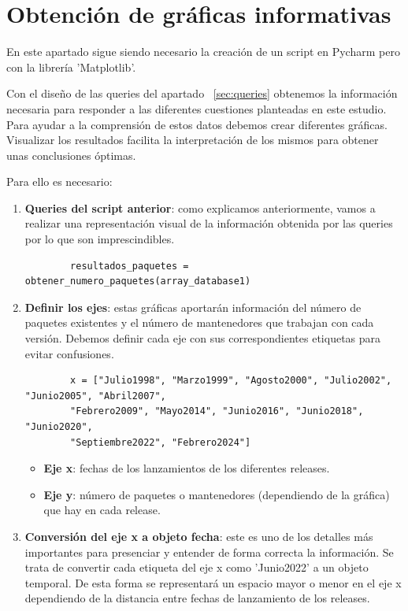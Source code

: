 \documentclass[a4paper, 12pt]{book}
\begin{document}
\section{Obtención de gráficas informativas}
\label{sec:graficas}

En este apartado sigue siendo necesario la creación de un script en Pycharm pero con la librería 'Matplotlib'.

Con el diseño de las queries del apartado ~\ref{sec:queries} obtenemos la información necesaria para responder a las diferentes cuestiones planteadas en este estudio.
Para ayudar a la comprensión de estos datos debemos crear diferentes gráficas.
Visualizar los resultados facilita la interpretación de los mismos para obtener unas conclusiones óptimas.

Para ello es necesario:
\begin{enumerate}
	\item \textbf{Queries del script anterior}: como explicamos anteriormente, vamos a realizar una representación visual de la información obtenida por las queries por lo que son imprescindibles.
	
	\begin{verbatim}
		resultados_paquetes = obtener_numero_paquetes(array_database1)
	\end{verbatim} 
	
	\item \textbf{Definir los ejes}: estas gráficas aportarán información del número de paquetes existentes y el número de mantenedores que trabajan con cada versión. Debemos definir cada eje con sus correspondientes etiquetas para evitar confusiones.
	
	\begin{verbatim}
		x = ["Julio1998", "Marzo1999", "Agosto2000", "Julio2002", "Junio2005", "Abril2007",
		"Febrero2009", "Mayo2014", "Junio2016", "Junio2018", "Junio2020",
		"Septiembre2022", "Febrero2024"]
	\end{verbatim} 
	
	\begin{itemize}
		\item \textbf{Eje x}: fechas de los lanzamientos de los diferentes releases.
		
		\item \textbf{Eje y}: número de paquetes o mantenedores (dependiendo de la gráfica) que hay en cada release.
	\end{itemize}
	
	\item \textbf{Conversión del eje x a objeto fecha}: este es uno de los detalles más importantes para presenciar y entender de forma correcta la información. Se trata de convertir cada etiqueta del eje x como 'Junio2022' a un objeto temporal. De esta forma se representará un espacio mayor o menor en el eje x dependiendo de la distancia entre fechas de lanzamiento de los releases.
	

\end{enumerate}
\end{document}
